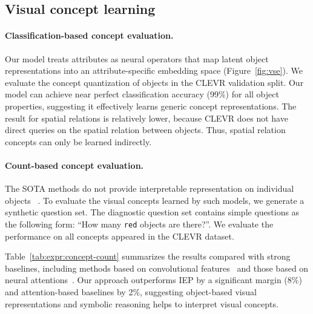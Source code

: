\documentclass{article} \usepackage{iclr2019_conference,times}
\newcommand{\fig}[1]{Figure~\ref{#1}}
\newcommand{\tbl}[1]{Table~\ref{#1}}
\newcommand{\myparagraph}[1]{\vspace{-3pt}\paragraph{#1}}
\begin{document}
\subsection{Visual concept learning}

\paragraph{Classification-based concept evaluation.}

Our model treats attributes as neural operators that map latent object representations into an attribute-specific embedding space (\fig{fig:vse}). We evaluate the concept quantization of objects in the CLEVR validation split. Our model can achieve near perfect classification accuracy (99\%) for all object properties, suggesting it effectively learns generic concept representations. The result for spatial relations is relatively lower, because CLEVR does not have direct queries on the spatial relation between objects. Thus, spatial relation concepts can only be learned indirectly.



\myparagraph{Count-based concept evaluation.}
The SOTA methods do not provide interpretable representation on individual objects~\citep{Johnson2017CLEVR,Hudson2018Compositional,Mascharka2018Transparency} . To evaluate the visual concepts learned by such models, we generate a synthetic question set. The diagnostic question set contains simple questions as the following form: ``How many \texttt{red} objects are there?''. We evaluate the performance on all concepts appeared in the CLEVR dataset.

\tbl{tab:expr:concept-count} summarizes the results compared with strong baselines, including methods based on convolutional features~\citep{Johnson2017Inferring} and those based on neural attentions~\citep{Mascharka2018Transparency,Hudson2018Compositional}.
Our approach outperforms IEP by a significant margin (8\%) and attention-based baselines by 2\%, suggesting object-based visual representations and symbolic reasoning helps to interpret visual concepts.
\end{document}
